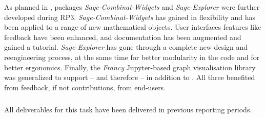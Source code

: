 As planned in , \ODK
packages \emph{Sage-Combinat-Widgets} and \emph{Sage-Explorer} were
further developed during RP3.
%
\emph{Sage-Combinat-Widgets} has gained in
flexibility and has been applied to a range of new mathematical
objects. User interfaces features like feedback have been enhanced,
and documentation has been augmented and gained a tutorial.
%
\emph{Sage-Explorer} has gone through a complete new design and reengineering process,
at the same time for better modularity in the code and for better ergonomics.
%
Finally, the \emph{Francy} Jupyter-based graph visualisation library
was generalized to support \Python -- and therefore \SageMath -- in
addition to \GAP.
%
All three benefited from feedback, if not contributions, from end-users.



\smallskip
\subparagraph{}
\label{UI@structdocs}

All deliverables for this task have been delivered in previous reporting periods.



